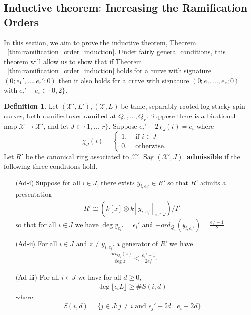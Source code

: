 \documentclass{amsart}
\theoremstyle{plain}
\theoremstyle{definition}
\newtheorem{defn}[thm]{Definition}
\theoremstyle{remark}
\numberwithin{equation}{section}
\newcommand\ssec{\subsection}
\newcommand \sx{\mathscr X}
\newcommand \subhalf[1]{\frac{{#1} - 1}{2{#1}}}
\begin{document}
\ssec{Inductive theorem: Increasing the Ramification Orders}
\label{ssec:g_0_ram_orders}
In this section, we aim to prove the inductive theorem, Theorem ~\ref{thm:ramification_order_induction}. Under fairly general conditions, this theorem will allow us to show that if Theorem ~\ref{thm:ramification_order_induction} holds for a curve with signature $(0;e_1',\ldots, e_r';0)$ then it also holds for a curve with signature $(0;e_1,\ldots, e_r;0)$ with $e_i' - e_i \in \{0,2\}$.

\begin{defn}
\label{defn:admissible}
Let $(\sx',L'),(\sx,L)$ be tame, separably rooted log stacky spin curves, both ramified over ramified at $Q_1,\ldots, Q_r$. Suppose there is a birational map $\sx \rightarrow \sx'$, and let $J \subset \{1,
\ldots, r\}$. Suppose $e_i'+ 2\chi_J(i) = e_i$ where
$$
\chi_J(i) = \begin{cases}
	1, &\text{ if }i \in J\\
	0, &\text{ otherwise. } 
\end{cases}$$
Let $R'$ be the canonical ring associated to $\sx'$. Say $(\sx',J)$, {\bf admissible} if the following three conditions hold.
\begin{enumerate}
	\item[(Ad-i)] Suppose for all $i \in J$, there exists $y_{i,e_i'} \in R'$ so that $R'$ admits a presentation
\begin{align*}
	R' \cong \left( k[x] \otimes k[y_{i,e_i'}]_{i \in J} \right)/I'
\end{align*}
so that for all $i \in J$ we have $\deg y_{e_i'} = e_i'$ and $-ord_{Q_i}(y_{i,e_i'}) = \frac{e_i'-1}{2}$.
\item[(Ad-ii)] For all $i \in J$ and $z \neq y_{i,e_i'}$ a generator of $R'$ we have
\begin{align*}
	\frac{- ord_{Q_i}(z)}{\deg z} < \subhalf {e_i'}.
\end{align*}
\item[(Ad-iii)] For all $i \in J$ we have for all $d \geq 0$,
\begin{align*}
	\deg \lfloor e_i L \rfloor \geq \# S(i,d)
\end{align*}
where
\begin{align*}
	S(i,d) = \{j \in J : j \neq i \text{ and }e_j'+2d \mid e_i+2d\}
\end{align*}
\end{enumerate}
\end{defn}
\end{document}
